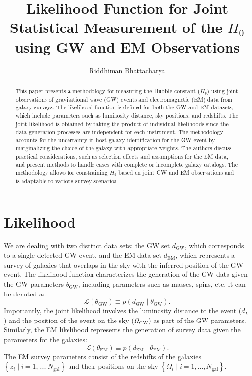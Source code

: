 \documentclass[modern]{article}
\title{\huge \textbf{Likelihood Function for Joint Statistical Measurement of the $H_0$ using GW and EM Observations}}
\author{\Large Riddhiman Bhattacharya}
\date{}
\newcommand{\dEM}{d_{\mathrm{EM}}}
\newcommand{\dGW}{d_{\mathrm{GW}}}
\newcommand{\Ngal}{N_{\mathrm{gal}}}
\begin{document}
\maketitle

\begin{abstract}
This paper presents a methodology for measuring the Hubble constant ($H_0$) using joint observations of gravitational wave (GW) events and electromagnetic (EM) data from galaxy surveys. The likelihood function is defined for both the GW and EM datasets, which include parameters such as luminosity distance, sky positions, and redshifts. The joint likelihood is obtained by taking the product of individual likelihoods since the data generation processes are independent for each instrument. The methodology accounts for the uncertainty in host galaxy identification for the GW event by marginalizing the choice of the galaxy with appropriate weights. The authors discuss practical considerations, such as selection effects and assumptions for the EM data, and present methods to handle cases with complete or incomplete galaxy catalogs. The methodology allows for constraining $H_0$ based on joint GW and EM observations and is adaptable to various survey scenarios
\end{abstract}





\section{Likelihood}

We are dealing with two distinct data sets: the \ac{GW} set $\dGW$, which corresponds to a single detected \ac{GW} event, and the \ac{EM} data set $\dEM$, which represents a survey of galaxies that overlaps in the sky with the inferred position of the \ac{GW} event. The likelihood function characterizes the generation of the \ac{GW} data given the \ac{GW} parameters $\theta_{\text{GW}}$, including parameters such as masses, spins, etc. It can be denoted as:
\begin{equation}
\mathcal{L}\left( \theta_{\text{GW}} \right) \equiv p\left( \dGW \mid \theta_{\text{GW}} \right).
\end{equation}
%
Importantly, the joint likelihood involves the luminosity distance to the event ($d_L$) and the position of the event on the sky ($\Omega_{\text{GW}}$) as part of the \ac{GW} parameters. Similarly, the \ac{EM} likelihood represents the generation of survey data given the parameters for the galaxies:
\begin{equation}
    \mathcal{L} \left( \theta_{\text{EM}} \right) \equiv p\left( \dEM \mid \theta_{\text{EM}} \right).
\end{equation}
The \ac{EM} survey parameters consist of the redshifts of the galaxies $\left\{ z_i \mid i = 1, \ldots, \Ngal \right\}$ and their positions on the sky $\left\{ \Omega_i \mid i = 1, \ldots, \Ngal \right\}$.
\end{document}
